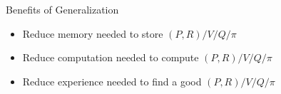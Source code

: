 \documentclass[aspectratio=169]{../latex_main/tntbeamer}  %
\begin{document}
\begin{frame}[c]{Benefits of Generalization}
	
	\begin{itemize}
		\item Reduce memory needed to store $(P,R) / V / Q / \pi$
		\item Reduce computation needed to compute $(P,R) / V / Q / \pi$
		\item Reduce experience needed to find a good $(P,R) / V / Q / \pi$
	\end{itemize}
	
\end{frame}
\end{document}
